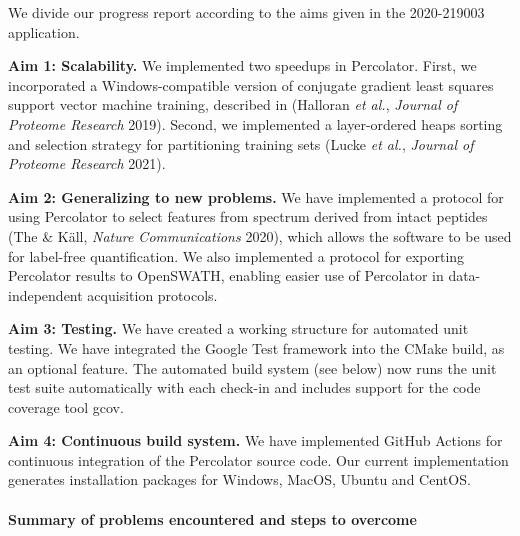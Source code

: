 \documentclass{article}
\begin{document}
We divide our progress report according to the aims given in the
2020-219003 application.


{\bf Aim 1: Scalability.} We implemented two speedups in Percolator.
First, we incorporated a Windows-compatible version of conjugate
gradient least squares support vector machine training, described in
(Halloran {\em et al.}, {\em Journal of Proteome Research} 2019).
Second, we implemented a layer-ordered heaps sorting and selection
strategy for partitioning training sets (Lucke {\em et al.}, {\em
  Journal of Proteome Research} 2021).

{\bf Aim 2: Generalizing to new problems.} We have implemented a
protocol for using Percolator to select features from spectrum derived
from intact peptides (The \& K\"{a}ll, {\em Nature Communications}
2020), which allows the software to be used for label-free
quantification. We also implemented a protocol for exporting
Percolator results to OpenSWATH, enabling easier use of Percolator in
data-independent acquisition protocols.

{\bf Aim 3: Testing.} We have created a working structure for
automated unit testing. We have integrated the Google Test framework
into the CMake build, as an optional feature. The automated build
system (see below) now runs the unit test suite automatically with
each check-in and includes support for the code coverage tool gcov.

{\bf Aim 4: Continuous build system.} We have implemented GitHub
Actions for continuous integration of the Percolator source code.  Our
current implementation generates installation packages for Windows,
MacOS, Ubuntu and CentOS.


\paragraph{Summary of problems encountered and steps to overcome}
\end{document}
